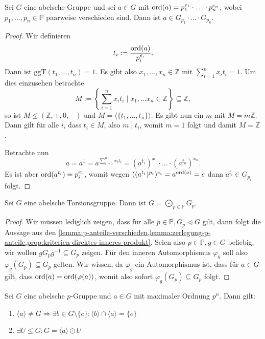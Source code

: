 \begin{lemma} \label{lemma:zerlegung-p-anteile}
    Sei $G$ eine abelsche Gruppe und sei $a \in G$ mit $\operatorname{ord}(a) = p_1^{e_1} \cdot \hdots \cdot p_n^{e_n}$, wobei $p_1, \hdots, p_n \in \mathbb{P}$ paarweise verschieden sind. Dann ist $a \in G_{p_1} \cdot \hdots \cdot G_{p_n}$.
\end{lemma}

\begin{proof}
    Wir definieren
    $$ t_i := \frac{\operatorname{ord}(a)}{p_i^{e_i}}. $$
    Dann ist $\mathrm{ggT}(t_1, \hdots, t_n) = 1$. Es gibt also $x_1, \hdots, x_n \in \mathbb{Z}$ mit $\sum_{i=1}^n x_i t_i = 1$. Um dies einzusehen betrachte
    $$ M := \left\{ \sum_{i=1}^n x_i t_i \mid x_1, \hdots x_n \in \mathbb{Z} \right\} \subseteq \mathbb{Z}, $$
    so ist $M \leq (\mathbb{Z}, +, 0, -)$ und $M = \langle \{ t_1, \hdots, t_n \} \rangle$. Es gibt nun ein $m$ mit $M = m \mathbb{Z}$. Dann gilt für alle $i$, dass $t_i \in M$, also $m \mid t_i$, womit $m = 1$ folgt und damit $M = \mathbb{Z}$.

    Betrachte nun
    $$ a = a^1 = a^{\sum_{i=1}^n x_i t_i} = (a^{t_1})^{x_1} \cdot \hdots \cdot (a^{t_n})^{x_n}. $$
    Es ist aber $\operatorname{ord}(a^{t_i}) = p_i^{e_i}$, womit wegen $((a^{t_i})^{p_i})^{e_i} = a^{\operatorname{ord}(a)} = e$ dann $a^{t_i} \in G_{p_i}$ folgt.
\end{proof}


\begin{theorem}
    Sei $G$ eine abelsche Torsionsgruppe. Dann ist $G = \bigodot_{p \in \mathbb{P}} G_p$.
\end{theorem}

\begin{proof}
    Wir müssen lediglich zeigen, dass für alle $p \in \mathbb{P}, G_p \vartriangleleft G$ gilt, dann folgt die Aussage aus den \cref{lemma:p-anteile-verschieden,lemma:zerlegung-p-anteile,prop:kriterien-direktes-inneres-produkt}. Seien also $p \in \mathbb{P}, g \in G$ beliebig, wir wollen $g G_p g^{-1} \subseteq G_p$ zeigen. Für den inneren Automorphismus $\varphi_g$ soll also $\varphi_g(G_p) \subseteq G_p$ gelten. Wir wissen, da $\varphi_g$ ein Automorphismus ist, dass für $a \in G$ gilt, dass $\operatorname{ord}(a) = \operatorname{ord}(\varphi(a))$, womit also sofort $\varphi_g(G_p) \subseteq G_p$ folgt.
\end{proof}

\begin{lemma}\label{lemma:p-gruppe-max-ordnung}
    Sei $G$ eine abelsche $p$-Gruppe und $a \in G$ mit maximaler Ordnung $p^n$. Dann gilt:
    \begin{enumerate}
        \item $\langle a \rangle \neq G \Rightarrow \exists b \in G \setminus \{ e \} : \langle b \rangle \cap \langle a \rangle = \{ e \}$\label{item:lemma:p-gruppe-max-ordnung:1}
        \item $\exists U \leq G: G = \langle a \rangle \odot U$
    \end{enumerate}
\end{lemma}

